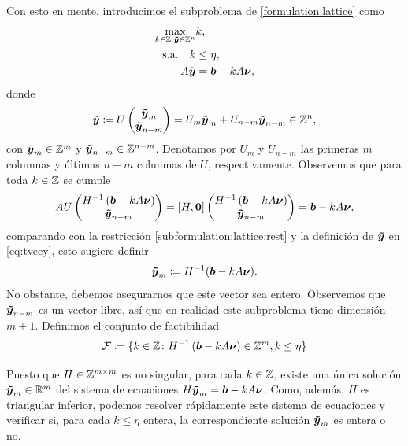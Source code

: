 Con esto en mente, introducimos el subproblema de \eqref{formulation:lattice} como
\begin{subequations}
	\label{subformulation:lattice}
	\begin{align}
		\max_{k \in \mathbb{Z}, \boldsymbol{\tilde{y}} \in \mathbb{Z}^n}
			& k, \\
		\text{s.a.} \quad
		k &\leq \eta, \\
			A\boldsymbol{\tilde{y}} &= \boldsymbol{b} - kA\boldsymbol{\nu} \label{subformulation:lattice:rest},
	\end{align}
\end{subequations}
donde 
\begin{equation}
	\label{eq:tvecy}
	\boldsymbol{\tilde{y}} \coloneq U \begin{pmatrix} \boldsymbol{\tilde{y}}_m \\ \boldsymbol{\tilde{y}}_{n-m} \end{pmatrix}
	= U_m\boldsymbol{\tilde{y}}_m + U_{n-m}\boldsymbol{\tilde{y}}_{n-m} \in \mathbb{Z}^n,
\end{equation}
con $\boldsymbol{\tilde{y}}_m \in \mathbb{Z}^m$ y $\boldsymbol{\tilde{y}}_{n-m} \in \mathbb{Z}^{n-m}$. Denotamos por $U_m$ y
$U_{n-m}$ las primeras $m$ columnas y últimas $n - m$ columnas de $U$, respectivamente.
Observemos que para toda $k \in \mathbb{Z}$ se cumple
\begin{equation}
	AU \begin{pmatrix} H^{-1}\left(\boldsymbol{b} - kA\boldsymbol{\nu}\right) \\ \boldsymbol{\tilde{y}}_{n-m} \end{pmatrix}
	=
	[H, \boldsymbol{0}] \begin{pmatrix} H^{-1}\left(\boldsymbol{b} - kA\boldsymbol{\nu}\right) \\ \boldsymbol{\tilde{y}}_{n-m} \end{pmatrix}
	= \boldsymbol{b} - kA\boldsymbol{\nu},
\end{equation}
comparando con la restricción \eqref{subformulation:lattice:rest} y la definición de $\boldsymbol{\tilde{y}}$ en
\eqref{eq:tvecy}, esto sugiere definir
\begin{equation}
	\label{eq:ym}
	\boldsymbol{\tilde{y}}_m \coloneq H^{-1}(\boldsymbol{b} - kA\boldsymbol{\nu}).
\end{equation}
No obstante, debemos asegurarnos que este vector sea entero. Observemos que $\boldsymbol{\tilde{y}}_{n-m}$ es un
vector libre, así que en realidad este subproblema tiene dimensión $m + 1$. Definimos el conjunto de
factibilidad
\begin{equation}
	\label{eq:feas-set}
	\mathcal{F} \coloneq \lbrace 
		k \in \mathbb{Z} \colon H^{-1}\left(\boldsymbol{b} - kA\boldsymbol{\nu}\right) \in \mathbb{Z}^m, k \leq \eta
	 \rbrace
\end{equation}

Puesto que $H \in \mathbb{Z}^{m \times m}$ es no singular, para cada $k \in \mathbb{Z}$, existe una única solución
$\boldsymbol{\tilde{y}}_m \in \mathbb{R}^m$ del sistema de ecuaciones $H\boldsymbol{\tilde{y}}_m = \boldsymbol{b} - kA\boldsymbol{\nu}$. Como, además, $H$
es triangular inferior, podemos resolver rápidamente este sistema de ecuaciones y verificar si, para
cada $k \leq \eta$ entera, la correspondiente solución $\boldsymbol{\tilde{y}}_m$ es entera o no.

